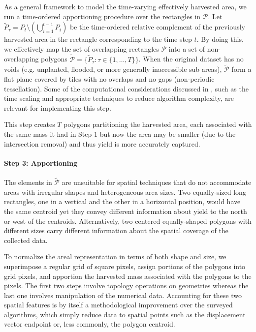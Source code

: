  As a general framework to model the
time-varying effectively harvested area, we run a time-ordered
apportioning procedure over the rectangles in $\mathcal{P}$. Let
$\tilde{P}_\tau = P_t \setminus \left( \bigcup_{i = 1}^{t - 1} P_i
\right)$ be the time-ordered relative complement of the previously
harvested area in the rectangle corresponding to the time step $t$. By
doing this, we effectively map the set of overlapping rectangles
$\mathcal{P}$ into a set of non-overlapping polygons
$\tilde{\mathcal{P}} = \{\tilde{P}_{\tau}: \tau \in \{1, \dots, T
\}\}$. When the original dataset has no voids (e.g. unplanted,
flooded, or more generally inaccessible sub areas),
$\tilde{\mathcal{P}}$ form a flat plane covered by tiles with no
overlaps and no gaps (non-periodic tessellation). Some of the
computational considerations discussed in \cite{Drummond1999}, such as
the time scaling and appropriate techniques to reduce algorithm
complexity, are relevant for implementing this step.

This step creates $T$ polygons partitioning the harvested area, each
associated with the same mass it had in Step 1 but now the area may be
smaller (due to the intersection removal) and thus yield is more
accurately captured.

\paragraph*{Step 3: Apportioning}  The elements in $\tilde{\mathcal{P}}$ are
unsuitable for spatial techniques that do not accommodate areas with
irregular shapes and heterogeneous area sizes. Two equally-sized long
rectangles, one in a vertical and the other in a horizontal position,
would have the same centroid yet they convey different information
about yield to the north or west of the centroids. Alternatively, two
centered equally-shaped polygons with different sizes carry different
information about the spatial coverage of the collected
data.

To normalize the areal representation in terms of both shape and size,
we superimpose a regular grid of square pixels, assign portions of the
polygons into grid pixels, and apportion the harvested mass associated
with the polygons to the pixels. The first two steps involve topology
operations on geometries whereas the last one involves manipulation of
the numerical data. Accounting for these two spatial features is by
itself a methodological improvement over the surveyed algorithms,
which simply reduce data to spatial points such as the displacement
vector endpoint or, less commonly, the polygon centroid.

